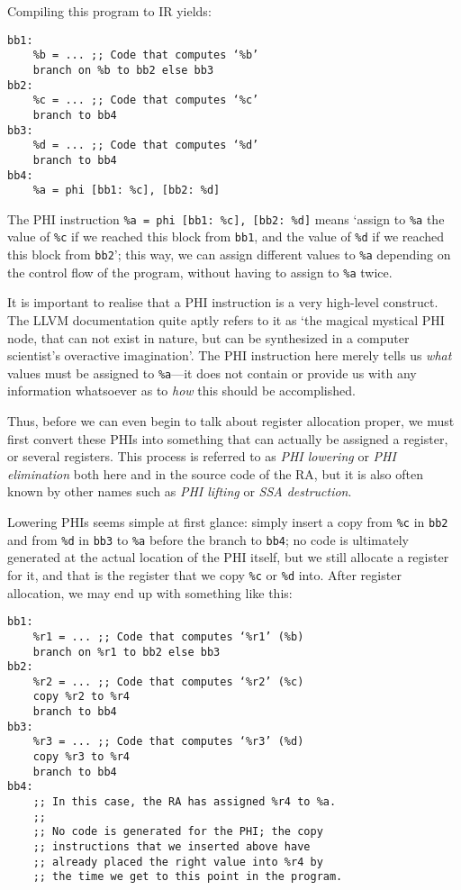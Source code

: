 \documentclass[12pt]{report}
\begin{document}
\noindent Compiling this program to IR yields:
\begin{Verbatim}
bb1:
    %b = ... ;; Code that computes ‘%b’
    branch on %b to bb2 else bb3
bb2:
    %c = ... ;; Code that computes ‘%c’
    branch to bb4
bb3:
    %d = ... ;; Code that computes ‘%d’
    branch to bb4
bb4:
    %a = phi [bb1: %c], [bb2: %d]
\end{Verbatim}

\noindent The PHI instruction \verb|%a = phi [bb1: %c], [bb2: %d]| means ‘assign to \verb|%a| the value of \verb|%c| if we reached this block
from \verb|bb1|, and the value of \verb|%d| if we reached this block from \verb|bb2|’; this way, we can assign different values to \verb|%a|
depending on the control flow of the program, without having to assign to \verb|%a| twice.

It is important to realise that a PHI instruction is a very high-level construct. The LLVM documentation quite aptly refers to it as ‘the 
magical mystical PHI node, that can not exist in nature, but can be synthesized in a computer scientist's overactive imagination’. The PHI 
instruction here merely tells us \textit{what} values must be assigned to \verb|%a|—it does not contain or provide us with any information
whatsoever as to \textit{how} this should be accomplished.

Thus, before we can even begin to talk about register allocation proper, we must first convert these PHIs into something that can
actually be assigned a register, or several registers. This process is referred to as \textit{PHI lowering} or \textit{PHI elimination}
both here and in the source code of the RA, but it is also often known by other names such as \textit{PHI lifting} or \textit{SSA 
destruction}.

Lowering PHIs seems simple at first glance: simply insert a copy from \verb|%c| in \verb|bb2| and from \verb|%d| in \verb|bb3| to 
\verb|%a| before the branch to \verb|bb4|; no code is ultimately generated at the actual location of the PHI itself, but we
still allocate a register for it, and that is the register that we copy \verb|%c| or \verb|%d| into. After register allocation, we may 
end up with something like this:
\begin{Verbatim}
bb1:
    %r1 = ... ;; Code that computes ‘%r1’ (%b)
    branch on %r1 to bb2 else bb3
bb2:
    %r2 = ... ;; Code that computes ‘%r2’ (%c)
    copy %r2 to %r4
    branch to bb4
bb3:
    %r3 = ... ;; Code that computes ‘%r3’ (%d)
    copy %r3 to %r4
    branch to bb4
bb4:
    ;; In this case, the RA has assigned %r4 to %a.
    ;;
    ;; No code is generated for the PHI; the copy
    ;; instructions that we inserted above have
    ;; already placed the right value into %r4 by
    ;; the time we get to this point in the program.
\end{Verbatim}
\end{document}
